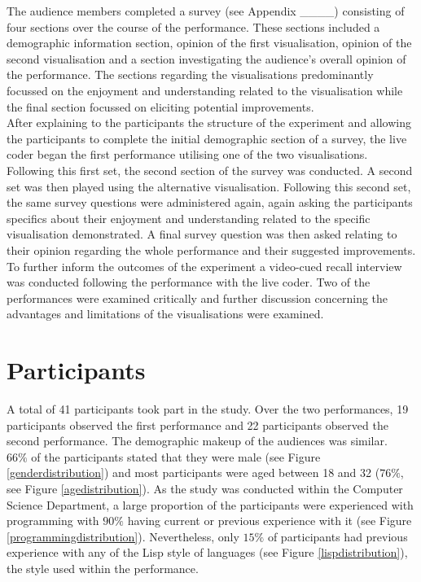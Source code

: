 \documentclass[12pt]{article}
\begin{document}
The audience members completed a survey (see Appendix \_\_\_\_) consisting of four sections over the course of the performance. These sections included a demographic information section, opinion of the first visualisation, opinion of the second visualisation and a section investigating the audience's overall opinion of the performance. The sections regarding the visualisations predominantly focussed on the enjoyment and understanding related to the visualisation while the final section focussed on eliciting potential improvements.\\

After explaining to the participants the structure of the experiment and allowing the participants to complete the initial demographic section of a survey, the live coder began the first performance utilising one of the two visualisations. Following this first set, the second section of the survey was conducted. A second set was then played using the alternative visualisation. Following this second set, the same survey questions were administered again, again asking the participants specifics about their enjoyment and understanding related to the specific visualisation demonstrated. A final survey question was then asked relating to their opinion regarding the whole performance and their suggested improvements.\\

To further inform the outcomes of the experiment a video-cued recall interview was conducted following the performance with the live coder. Two of the performances were examined critically and further discussion concerning the advantages and limitations of the visualisations were examined.

\section{Participants}

A total of 41 participants took part in the study. Over the two performances, 19 participants observed the first performance and 22 participants observed the second performance. The demographic makeup of the audiences was similar.\\

$66\%$ of the participants stated that they were male (see Figure \ref{genderdistribution}) and most participants were aged between 18 and 32 ($76\%$, see Figure \ref{agedistribution}). As the study was conducted within the Computer Science Department, a large proportion of the participants were experienced with programming with $90\%$ having current or previous experience with it (see Figure \ref{programmingdistribution}). Nevertheless, only $15\%$ of participants had previous experience with any of the Lisp style of languages (see Figure \ref{lispdistribution}), the style used within the performance.\\
\end{document}
